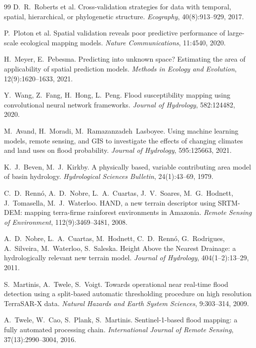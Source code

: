 \documentclass[11pt,a4paper]{article}
\begin{document}
\begin{thebibliography}{99}
D.~R.~Roberts et al.
Cross-validation strategies for data with temporal, spatial, hierarchical, or
phylogenetic structure.
\emph{Ecography}, 40(8):913--929, 2017.

P.~Ploton et al.
Spatial validation reveals poor predictive performance of large-scale ecological
mapping models.
\emph{Nature Communications}, 11:4540, 2020.

H.~Meyer, E.~Pebesma.
Predicting into unknown space? Estimating the area of applicability of spatial
prediction models.
\emph{Methods in Ecology and Evolution}, 12(9):1620--1633, 2021.

Y.~Wang, Z.~Fang, H.~Hong, L.~Peng.
Flood susceptibility mapping using convolutional neural network frameworks.
\emph{Journal of Hydrology}, 582:124482, 2020.

M.~Avand, H.~Moradi, M.~Ramazanzadeh~Lasboyee.
Using machine learning models, remote sensing, and GIS to investigate the effects
of changing climates and land uses on flood probability.
\emph{Journal of Hydrology}, 595:125663, 2021.

K.~J.~Beven, M.~J.~Kirkby.
A physically based, variable contributing area model of basin hydrology.
\emph{Hydrological Sciences Bulletin}, 24(1):43--69, 1979.

C.~D.~Renn\'o, A.~D.~Nobre, L.~A.~Cuartas, J.~V.~Soares, M.~G.~Hodnett,
J.~Tomasella, M.~J.~Waterloo.
HAND, a new terrain descriptor using SRTM-DEM: mapping terra-firme rainforest
environments in Amazonia.
\emph{Remote Sensing of Environment}, 112(9):3469--3481, 2008.

A.~D.~Nobre, L.~A.~Cuartas, M.~Hodnett, C.~D.~Renn\'o, G.~Rodrigues, A.~Silveira,
M.~Waterloo, S.~Saleska.
Height Above the Nearest Drainage: a hydrologically relevant new terrain model.
\emph{Journal of Hydrology}, 404(1--2):13--29, 2011.

S.~Martinis, A.~Twele, S.~Voigt.
Towards operational near real-time flood detection using a split-based automatic
thresholding procedure on high resolution TerraSAR-X data.
\emph{Natural Hazards and Earth System Sciences}, 9:303--314, 2009.

A.~Twele, W.~Cao, S.~Plank, S.~Martinis.
Sentinel-1-based flood mapping: a fully automated processing chain.
\emph{International Journal of Remote Sensing}, 37(13):2990--3004, 2016.


\end{thebibliography}
\end{document}
